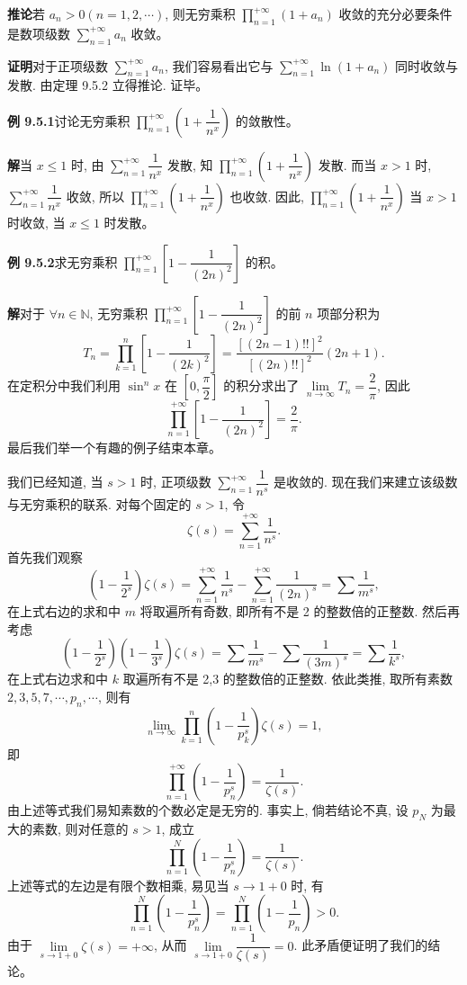 \documentclass[UTF8,12pt,a4paper,fontset=fandol]{ctexart}
\begin{document}
\noindent\textbf{推论}\quad 若 $a_n>0(n=1,2,\cdots)$, 则无穷乘积 $\prod\limits_{n=1}^{+\infty}(1+a_n)$ 收敛的充分必要条件是数项级数 $\sum\limits_{n=1}^{+\infty}a_n$ 收敛。

\noindent\textbf{证明}\quad 对于正项级数 $\sum\limits_{n=1}^{+\infty}a_n$, 我们容易看出它与 $\sum\limits_{n=1}^{+\infty}\ln(1+a_n)$ 同时收敛与发散. 由定理 9.5.2 立得推论. 证毕。

\noindent\textbf{例 9.5.1}\quad 讨论无穷乘积 $\prod\limits_{n=1}^{+\infty}\left(1+\dfrac1{n^x}\right)$ 的敛散性。

\noindent\textbf{解}\quad 当 $x\leq1$ 时, 由 $\sum\limits_{n=1}^{+\infty}\dfrac1{n^x}$ 发散, 知 $\prod\limits_{n=1}^{+\infty}\left(1+\dfrac1{n^x}\right)$ 发散. 而当 $x>1$ 时, $\sum\limits_{n=1}^{+\infty}\dfrac1{n^x}$ 收敛, 所以 $\prod\limits_{n=1}^{+\infty}\left(1+\dfrac1{n^x}\right)$ 也收敛. 因此, $\prod\limits_{n=1}^{+\infty}\left(1+\dfrac1{n^x}\right)$ 当 $x>1$ 时收敛, 当 $x\leq1$ 时发散。

\noindent\textbf{例 9.5.2}\quad 求无穷乘积 $\prod\limits_{n=1}^{+\infty}\left[1-\dfrac1{(2n)^2}\right]$ 的积。

\noindent\textbf{解}\quad 对于 $\forall n\in\mathbb{N}$, 无穷乘积 $\prod\limits_{n=1}^{+\infty}\left[1-\dfrac1{(2n)^2}\right]$ 的前 $n$ 项部分积为
\[
  T_n=\prod_{k=1}^n\left[1-\frac1{(2k)^2}\right]
  =\frac{[(2n-1)!!]^2}{[(2n)!!]^2}(2n+1).
\]
在定积分中我们利用 $\sin^n x$ 在 $\left[0,\dfrac{\pi}{2}\right]$ 的积分求出了 $\lim\limits_{n\to\infty}T_n=\dfrac2\pi$, 因此
\[
  \prod_{n=1}^{+\infty}\left[1-\frac1{(2n)^2}\right]=\frac2\pi.
\]
最后我们举一个有趣的例子结束本章。

我们已经知道, 当 $s>1$ 时, 正项级数 $\sum\limits_{n=1}^{+\infty}\dfrac1{n^s}$ 是收敛的. 现在我们来建立该级数与无穷乘积的联系. 对每个固定的 $s>1$, 令
\[
  \zeta(s)=\sum_{n=1}^{+\infty}\frac1{n^s}.
\]
首先我们观察
\[
  \left(1-\frac1{2^s}\right)\zeta(s)
  =\sum_{n=1}^{+\infty}\frac1{n^s}-\sum_{n=1}^{+\infty}\frac1{(2n)^s}
  =\sum\frac1{m^s},
\]
在上式右边的求和中 $m$ 将取遍所有奇数, 即所有不是 2 的整数倍的正整数. 然后再考虑
\[
  \left(1-\frac1{2^s}\right)\left(1-\frac1{3^s}\right)\zeta(s)
  =\sum\frac1{m^s}-\sum\frac1{(3m)^s}
  =\sum\frac1{k^s},
\]
在上式右边求和中 $k$ 取遍所有不是 2,3 的整数倍的正整数. 依此类推, 取所有素数 $2,3,5,7,\cdots,p_n,\cdots$, 则有
\[
  \lim_{n\to\infty}\prod_{k=1}^n\left(1-\frac1{p_k^s}\right)\zeta(s)=1,
\]
即
\[
  \prod_{n=1}^{+\infty}\left(1-\frac1{p_n^s}\right)=\frac1{\zeta(s)}.
\]
由上述等式我们易知素数的个数必定是无穷的. 事实上, 倘若结论不真, 设 $p_N$ 为最大的素数, 则对任意的 $s>1$, 成立
\[
  \prod_{n=1}^N\left(1-\frac1{p_n^s}\right)=\frac1{\zeta(s)}.
\]
上述等式的左边是有限个数相乘, 易见当 $s\to1+0$ 时, 有
\[
  \prod_{n=1}^N\left(1-\frac1{p_n^s}\right)=\prod_{n=1}^N\left(1-\frac1{p_n}\right)>0.
\]
由于 $\lim\limits_{s\to1+0}\zeta(s)=+\infty$, 从而 $\lim\limits_{s\to1+0}\dfrac1{\zeta(s)}=0$. 此矛盾便证明了我们的结论。
\end{document}
